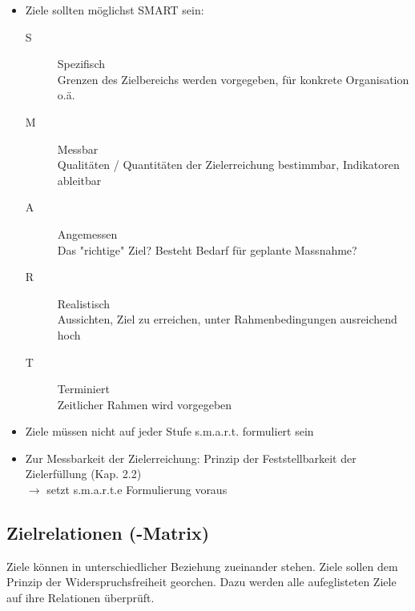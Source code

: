 \documentclass[a4paper]{article}
\begin{document}
			\begin{itemize}
				\item Ziele sollten möglichst SMART sein:
					\begin{description}
						\item[S] Spezifisch\\
						Grenzen des Zielbereichs werden vorgegeben, für konkrete Organisation o.ä.
						\item[M] Messbar\\
						Qualitäten / Quantitäten der Zielerreichung bestimmbar, Indikatoren ableitbar
						\item[A] Angemessen\\
						Das "richtige" Ziel? Besteht Bedarf für geplante Massnahme?
						\item[R] Realistisch\\
						Aussichten, Ziel zu erreichen, unter Rahmenbedingungen ausreichend hoch
						\item[T] Terminiert\\
						Zeitlicher Rahmen wird vorgegeben
					\end{description}
				\item Ziele müssen nicht auf jeder Stufe s.m.a.r.t. formuliert sein
				\item Zur Messbarkeit der Zielerreichung: Prinzip der Feststellbarkeit der Zielerfüllung (Kap. 2.2)\\ $\rightarrow$ setzt s.m.a.r.t.e Formulierung voraus
			\end{itemize}
		
\newpage
		
		\subsection{Zielrelationen (-Matrix)}
		
		Ziele können in unterschiedlicher Beziehung zueinander stehen.
		Ziele sollen dem Prinzip der Widerspruchsfreiheit georchen.
		Dazu werden alle aufeglisteten Ziele auf ihre Relationen überprüft.
		
\end{document}
